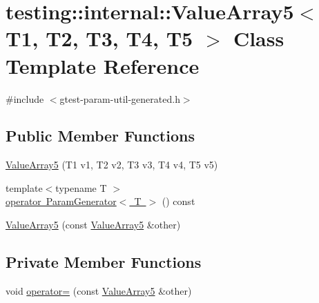 \hypertarget{classtesting_1_1internal_1_1_value_array5}{}\section{testing\+::internal\+::Value\+Array5$<$ T1, T2, T3, T4, T5 $>$ Class Template Reference}
\label{classtesting_1_1internal_1_1_value_array5}


{\ttfamily \#include $<$gtest-\/param-\/util-\/generated.\+h$>$}

\subsection*{Public Member Functions}
\begin{DoxyCompactItemize}
\item 
\mbox{\hyperlink{classtesting_1_1internal_1_1_value_array5_a9c5687fd18da21263aebc21b9ea508b8}{Value\+Array5}} (T1 v1, T2 v2, T3 v3, T4 v4, T5 v5)
\item 
{\footnotesize template$<$typename T $>$ }\\\mbox{\hyperlink{classtesting_1_1internal_1_1_value_array5_ab925a168d89be9964c4319e5212222c1}{operator Param\+Generator$<$ T $>$}} () const
\item 
\mbox{\hyperlink{classtesting_1_1internal_1_1_value_array5_a7de67e844073d0ec3c7c6e5736fb9ba6}{Value\+Array5}} (const \mbox{\hyperlink{classtesting_1_1internal_1_1_value_array5}{Value\+Array5}} \&other)
\end{DoxyCompactItemize}
\subsection*{Private Member Functions}
\begin{DoxyCompactItemize}
\item 
void \mbox{\hyperlink{classtesting_1_1internal_1_1_value_array5_a26e912217715e21a61351b4091d68487}{operator=}} (const \mbox{\hyperlink{classtesting_1_1internal_1_1_value_array5}{Value\+Array5}} \&other)
\end{DoxyCompactItemize}
